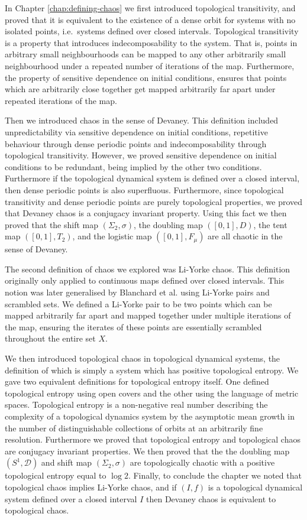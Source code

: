In Chapter \ref{chap:defining-chaos} we first introduced topological transitivity, and proved that it is equivalent to the existence of a dense orbit for systems with no isolated points, i.e.\ systems defined over closed intervals. Topological transitivity is a property that introduces indecomposability to the system. That is, points in arbitrary small neighbourhoods can be mapped to any other arbitrarily small neighbourhood under a repeated number of iterations of the map. Furthermore, the property of sensitive dependence on initial conditions, ensures that points which are arbitrarily close together get mapped arbitrarily far apart under repeated iterations of the map.

Then we introduced chaos in the sense of Devaney. This definition included unpredictability via sensitive dependence on initial conditions, repetitive behaviour through dense periodic points and indecomposability through topological transitivity. However, we proved sensitive dependence on initial conditions to be redundant, being implied by the other two conditions. Furthermore if the topological dynamical system is defined over a closed interval, then dense periodic points is also superfluous. Furthermore, since topological transitivity and dense periodic points are purely topological properties, we proved that Devaney chaos is a conjugacy invariant property. Using this fact we then proved that the shift map $(\Sigma_2, \sigma)$, the doubling map $([0, 1], D)$, the tent map $([0, 1], T_2)$, and the logistic map $([0, 1], F_\mu)$ are all chaotic in the sense of Devaney. 

The second definition of chaos we explored was Li-Yorke chaos. This definition originally only applied to continuous maps defined over closed intervals. This notion was later generalised by Blanchard et al.\cite{blanchard} using Li-Yorke pairs and scrambled sets. We defined a Li-Yorke pair to be two points which can be mapped arbitrarily far apart and mapped together under multiple iterations of the map, ensuring the iterates of these points are essentially scrambled throughout the entire set $X$. 

We then introduced topological chaos in topological dynamical systems, the definition of which is simply a system which has positive topological entropy. We gave two equivalent definitions for topological entropy itself. One defined topological entropy using open covers and the other using the language of metric spaces. Topological entropy is a non-negative real number describing the complexity of a topological dynamics system by the asymptotic mean growth in the number of distinguishable collections of orbits at an arbitrarily fine resolution. Furthermore we proved that topological entropy and topological chaos are conjugacy invariant properties. We then proved that the the doubling map $(S^1, \mathcal{D})$ and shift map $(\Sigma_2, \sigma)$ are topologically chaotic with a positive topological entropy equal to $\log 2$. Finally, to conclude the chapter we noted that topological chaos implies Li-Yorke chaos, and if $(I, f)$ is a topological dynamical system defined over a closed interval $I$ then Devaney chaos is equivalent to topological chaos.

